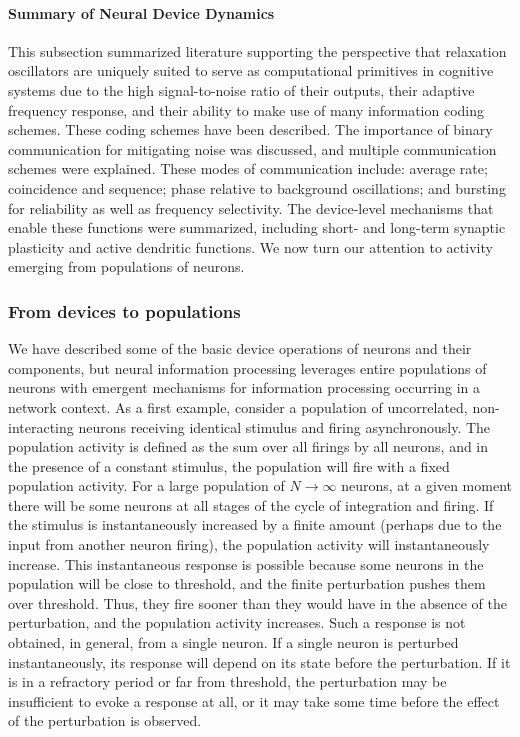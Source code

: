 \paragraph{Summary of Neural Device Dynamics}
This subsection summarized literature supporting the perspective that relaxation oscillators are uniquely suited to serve as computational primitives in cognitive systems due to the high signal-to-noise ratio of their outputs, their adaptive frequency response, and their ability to make use of many information coding schemes. These coding schemes have been described. The importance of binary communication for mitigating noise was discussed, and multiple communication schemes were explained. These modes of communication include: average rate; coincidence and sequence; phase relative to background oscillations; and bursting for reliability as well as frequency selectivity. The device-level mechanisms that enable these functions were summarized, including short- and long-term synaptic plasticity and active dendritic functions. We now turn our attention to activity emerging from populations of neurons.

\subsubsection{\label{sec:populations}From devices to populations}
We have described some of the basic device operations of neurons and their components, but neural information processing leverages entire populations of neurons with emergent mechanisms for information processing occurring in a network context. As a first example, consider a population of uncorrelated, non-interacting neurons receiving identical stimulus and firing asynchronously. The population activity is defined as the sum over all firings by all neurons, and in the presence of a constant stimulus, the population will fire with a fixed population activity. For a large population of $N\longrightarrow\infty$ neurons, at a given moment there will be some neurons  at all stages of the cycle of integration and firing. If the stimulus is instantaneously increased by a finite amount (perhaps due to the input from another neuron firing), the population activity will instantaneously increase. This instantaneous response is possible because some neurons in the population will be close to threshold, and the finite perturbation pushes them over threshold. Thus, they fire sooner than they would have in the absence of the perturbation, and the population activity increases. Such a response is not obtained, in general, from a single neuron. If a single neuron is perturbed instantaneously, its response will depend on its state before the perturbation. If it is in a refractory period or far from threshold, the perturbation may be insufficient to evoke a response at all, or it may take some time before the effect of the perturbation is observed.

